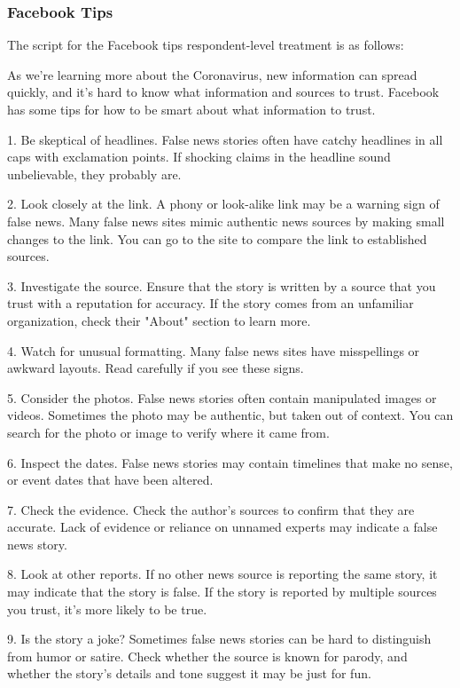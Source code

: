 \documentclass[letterpaper, 12pt, parskip=full,]{scrartcl}
\begin{document}
\subsubsection{Facebook Tips}\label{sec:fbtips}
The script for the Facebook tips respondent-level treatment is as follows:

As we're learning more about the Coronavirus, new information can spread quickly, and it's hard to know what information and sources to trust. Facebook has some tips for how to be smart about what information to trust. 

1. Be skeptical of headlines. False news stories often have catchy headlines in all caps with exclamation points. If shocking claims in the headline sound unbelievable, they probably are.

2. Look closely at the link. A phony or look-alike link may be a warning sign of false news. Many false news sites mimic authentic news sources by making small changes to the link. You can go to the site to compare the link to established sources.

3. Investigate the source. Ensure that the story is written by a source that you trust with a reputation for accuracy. If the story comes from an unfamiliar organization, check their "About" section to learn more.

4. Watch for unusual formatting. Many false news sites have misspellings or awkward layouts. Read carefully if you see these signs.

5. Consider the photos. False news stories often contain manipulated images or videos. Sometimes the photo may be authentic, but taken out of context. You can search for the photo or image to verify where it came from.

6. Inspect the dates. False news stories may contain timelines that make no sense, or event dates that have been altered.

7. Check the evidence. Check the author's sources to confirm that they are accurate. Lack of evidence or reliance on unnamed experts may indicate a false news story.

8. Look at other reports. If no other news source is reporting the same story, it may indicate that the story is false. If the story is reported by multiple sources you trust, it's more likely to be true.

9. Is the story a joke? Sometimes false news stories can be hard to distinguish from humor or satire. Check whether the source is known for parody, and whether the story's details and tone suggest it may be just for fun.
\end{document}
